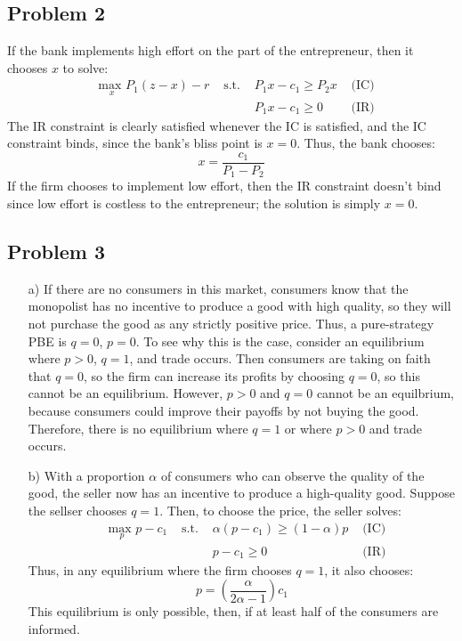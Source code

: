 \documentclass{article}
\newcommand{\usmax}[1]{\underset{#1}{\text{max }}}
\begin{document}

\subsection*{Problem 2}
If the bank implements high effort on the part of the entrepreneur, then it chooses $x$ to solve:
\begin{align*}
	&\usmax{x}P_1(z-x) - r	&\text{ s.t. }	&P_1x-c_1\geq P_2x	&\text{ (IC)}	\\
	&						&				&P_1x-c_1\geq 0		&\text{ (IR)}
\end{align*}
The IR constraint is clearly satisfied whenever the IC is satisfied, and the IC constraint binds, since the bank's bliss point is ${x=0}$. Thus, the bank chooses:
\[
	x = \frac{c_1}{P_1-P_2}
\]
If the firm chooses to implement low effort, then the IR constraint doesn't bind since low effort is costless to the entrepreneur; the solution is simply ${x=0}$. 

\pagebreak
\subsection*{Problem 3}

\begin{itemize}
	\item[a)] If there are no consumers in this market, consumers know that the monopolist has no incentive to produce a good with high quality, so they will not purchase the good as any strictly positive price. Thus, a pure-strategy PBE is ${q=0}$, ${p=0}$. To see why this is the case, consider an equilibrium where ${p>0}$, ${q=1}$, and trade occurs. Then consumers are taking on faith that ${q=0}$, so the firm can increase its profits by choosing ${q=0}$, so this cannot be an equilibrium. However, ${p>0}$ and ${q=0}$ cannot be an equilbrium, because consumers could improve their payoffs by not buying the good. Therefore, there is no equilibrium where ${q=1}$ or where ${p>0}$ and trade occurs.
	
	\item[b)] With a proportion $\alpha$ of consumers who can observe the quality of the good, the seller now has an incentive to produce a high-quality good. Suppose the sellser chooses ${q=1}$. Then, to choose the price, the seller solves:
		\begin{align*}
			&\usmax{p}p-c_1	&\text{ s.t. }	&\alpha\left(p-c_1\right) \geq (1-\alpha)p	&\text{ (IC)}	\\
			&				&				&p-c_1\geq 0								&\text{ (IR)}
		\end{align*}
		Thus, in any equilibrium where the firm chooses ${q=1}$, it also chooses:
		\[
			p = \left(\frac{\alpha}{2\alpha-1}\right)c_1
		\]
		This equilibrium is only possible, then, if at least half of the consumers are informed.
		
\end{itemize}

\end{document}
